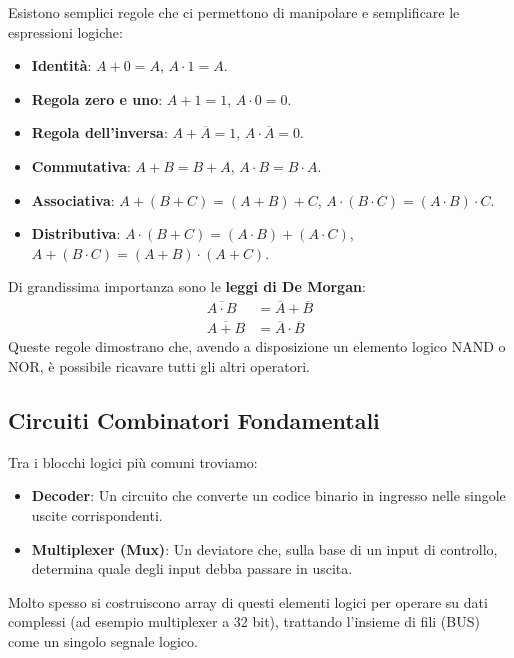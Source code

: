 \documentclass[12pt, a4paper]{article}
\begin{document}
Esistono semplici regole che ci permettono di manipolare e semplificare le espressioni logiche:
\begin{itemize}
    \item \textbf{Identità}: $A+0=A$, $A\cdot 1=A$.
    \item \textbf{Regola zero e uno}: $A+1=1$, $A\cdot 0=0$.
    \item \textbf{Regola dell'inversa}: $A+\overline{A}=1$, $A\cdot \overline{A}=0$.
    \item \textbf{Commutativa}: $A+B=B+A$, $A\cdot B=B\cdot A$.
    \item \textbf{Associativa}: $A+(B+C)=(A+B)+C$, $A\cdot(B\cdot C)=(A\cdot B)\cdot C$.
    \item \textbf{Distributiva}: $A\cdot(B+C)=(A\cdot B)+(A\cdot C)$, $A+(B\cdot C)=(A+B)\cdot(A+C)$.
\end{itemize}

Di grandissima importanza sono le \textbf{leggi di De Morgan}:
\begin{align*}
    \overline{A\cdot B} &= \overline{A}+\overline{B} \\
    \overline{A+B} &= \overline{A}\cdot\overline{B}
\end{align*}
Queste regole dimostrano che, avendo a disposizione un elemento logico NAND o NOR, è possibile ricavare tutti gli altri operatori.

\subsection{Circuiti Combinatori Fondamentali}
Tra i blocchi logici più comuni troviamo:
\begin{itemize}
    \item \textbf{Decoder}: Un circuito che converte un codice binario in ingresso nelle singole uscite corrispondenti.
    \item \textbf{Multiplexer (Mux)}: Un deviatore che, sulla base di un input di controllo, determina quale degli input debba passare in uscita.
\end{itemize}
Molto spesso si costruiscono array di questi elementi logici per operare su dati complessi (ad esempio multiplexer a 32 bit), trattando l'insieme di fili (BUS) come un singolo segnale logico.
\end{document}
